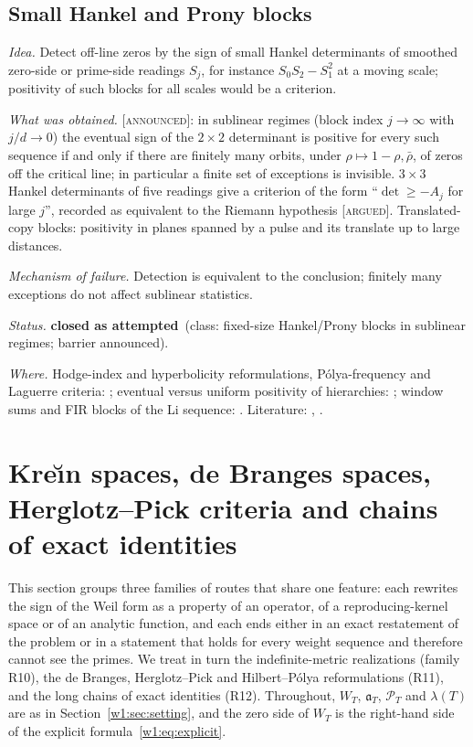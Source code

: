 \documentclass[11pt]{amsart}
\theoremstyle{definition}
\theoremstyle{remark}
\numberwithin{equation}{section}
\newcommand{\PT}{\mathcal{P}_T}                        %
\newcommand{\aT}{\mathfrak{a}_T}                       %
\newcommand{\WT}{W_T}                                  %
\newcommand{\lam}{\lambda(T)}                          %
\newcommand{\stag}[1]{\textsc{[#1]}}
\newcommand{\ARGUED}{\stag{argued}}
\newcommand{\ANNOUNCED}{\stag{announced}}
\newcommand{\rtag}[1]{\textbf{\small\textsf{#1}}}
\newcommand{\closedA}{\rtag{closed as attempted}}
\newcommand{\entry}[1]{\par\smallskip\noindent\textit{#1.}\enspace}
\begin{document}
\subsection{Small Hankel and Prony blocks}\label{w5:subsec:hankel}

\entry{Idea} Detect off-line zeros by the sign of small Hankel determinants of smoothed zero-side or prime-side readings
$S_j$, for instance $S_0S_2-S_1^2$ at a moving scale; positivity of such blocks for all scales would be a criterion.

\entry{What was obtained} \ANNOUNCED: in sublinear regimes (block index $j\to\infty$ with $j/d\to0$) the eventual sign of the
$2\times2$ determinant is positive for every such sequence if and only if there are finitely many orbits, under
$\rho\mapsto1-\rho,\bar\rho$, of zeros off the critical line; in particular a finite set of exceptions is invisible. $3\times3$ Hankel determinants of five readings give a
criterion of the form ``$\det\ge-A_j$ for large $j$'', recorded as equivalent to the Riemann hypothesis \ARGUED.
Translated-copy blocks: positivity in planes spanned by a pulse and its translate up to large distances.

\entry{Mechanism of failure} Detection is equivalent to the conclusion; finitely many exceptions do not affect sublinear
statistics.

\entry{Status} \closedA\ (class: fixed-size Hankel/Prony blocks in sublinear regimes; barrier announced).

\entry{Where} Hodge-index and hyperbolicity reformulations, Pólya-frequency and Laguerre criteria: \cite{P14}; eventual
versus uniform positivity of hierarchies: \cite{P15}; window sums and FIR blocks of the Li sequence: \cite{P38}. Literature:
\cite{Schoenberg1951}, \cite{PlattTrudgian2021}.


\section{Kre\u{\i}n spaces, de Branges spaces, Herglotz--Pick criteria and chains of exact identities}
\label{w6:sec:operators}

This section groups three families of routes that share one feature: each rewrites the sign of
the Weil form as a property of an operator, of a reproducing-kernel space or of an analytic
function, and each ends either in an exact restatement of the problem or in a statement that
holds for every weight sequence and therefore cannot see the primes. We treat in turn the
indefinite-metric realizations (family R10), the de Branges, Herglotz--Pick and Hilbert--P\'olya
reformulations (R11), and the long chains of exact identities (R12). Throughout, $\WT$, $\aT$,
$\PT$ and $\lam$ are as in Section~\ref{w1:sec:setting}, and the zero side of $\WT$ is the
right-hand side of the explicit formula~\eqref{w1:eq:explicit}.
\end{document}

